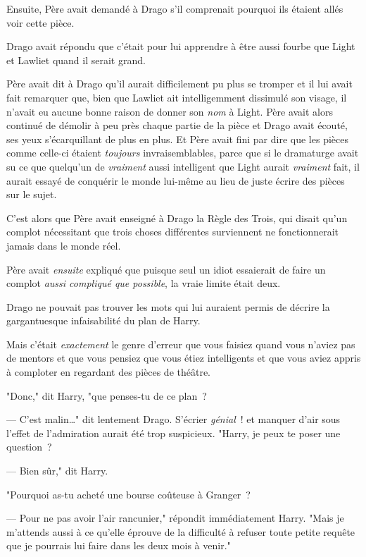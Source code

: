 Ensuite, Père avait demandé à Drago s'il comprenait pourquoi ils étaient allés voir cette pièce.

Drago avait répondu que c'était pour lui apprendre à être aussi fourbe que Light et Lawliet quand il serait grand.

Père avait dit à Drago qu'il aurait difficilement pu plus se tromper et il lui avait fait remarquer que, bien que Lawliet ait intelligemment dissimulé son visage, il n'avait eu aucune bonne raison de donner son \emph{nom} à Light. Père avait alors continué de démolir à peu près chaque partie de la pièce et Drago avait écouté, ses yeux s'écarquillant de plus en plus. Et Père avait fini par dire que les pièces comme celle-ci étaient \emph{toujours} invraisemblables, parce que si le dramaturge avait su ce que quelqu'un de \emph{vraiment} aussi intelligent que Light aurait \emph{vraiment} fait, il aurait essayé de conquérir le monde lui-même au lieu de juste écrire des pièces sur le sujet.

C'est alors que Père avait enseigné à Drago la Règle des Trois, qui disait qu'un complot nécessitant que trois choses différentes surviennent ne fonctionnerait jamais dans le monde réel.

Père avait \emph{ensuite} expliqué que puisque seul un idiot essaierait de faire un complot \emph{aussi compliqué que possible}, la vraie limite était deux.

Drago ne pouvait pas trouver les mots qui lui auraient permis de décrire la gargantuesque infaisabilité du plan de Harry.

Mais c'était \emph{exactement} le genre d'erreur que vous faisiez quand vous n'aviez pas de mentors et que vous pensiez que vous étiez intelligents et que vous aviez appris à comploter en regardant des pièces de théâtre.

"Donc," dit Harry, "que penses-tu de ce plan~?

--- C'est malin…" dit lentement Drago. S'écrier \emph{génial}~! et manquer d'air sous l'effet de l'admiration aurait été trop suspicieux. "Harry, je peux te poser une question~?

--- Bien sûr," dit Harry.

"Pourquoi as-tu acheté une bourse coûteuse à Granger~?

--- Pour ne pas avoir l'air rancunier," répondit immédiatement Harry. "Mais je m'attends aussi à ce qu'elle éprouve de la difficulté à refuser toute petite requête que je pourrais lui faire dans les deux mois à venir."

